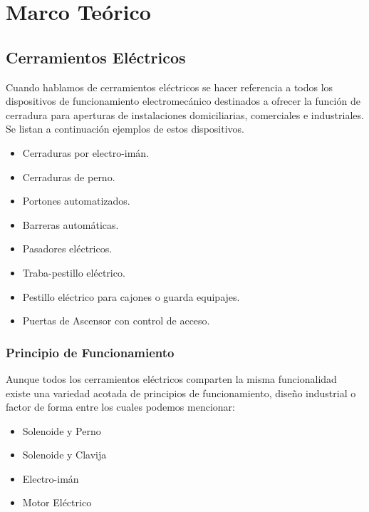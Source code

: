 
\chapter{Marco Teórico} %

\label{Chapter2} %


\section{Cerramientos Eléctricos}
Cuando hablamos de cerramientos eléctricos se hacer referencia a todos los dispositivos
de funcionamiento electromecánico destinados a ofrecer la función de cerradura para aperturas de instalaciones domiciliarias, comerciales e industriales.
Se listan a continuación ejemplos de estos dispositivos.
\begin{itemize}
	\item Cerraduras por electro-imán.
	\item Cerraduras de perno.
	\item Portones automatizados.
	\item Barreras automáticas.
	\item Pasadores eléctricos.
	\item Traba-pestillo eléctrico.
	\item Pestillo eléctrico para cajones o guarda equipajes.
	\item Puertas de Ascensor con control de acceso.
\end{itemize}


\subsection{Principio de Funcionamiento}
Aunque todos los cerramientos eléctricos comparten la misma funcionalidad existe una variedad acotada de principios de funcionamiento, diseño industrial o factor de forma entre los cuales podemos mencionar:
\begin{itemize}
	\item Solenoide y Perno
	\item Solenoide y Clavija
	\item Electro-imán
	\item Motor Eléctrico
\end{itemize}

